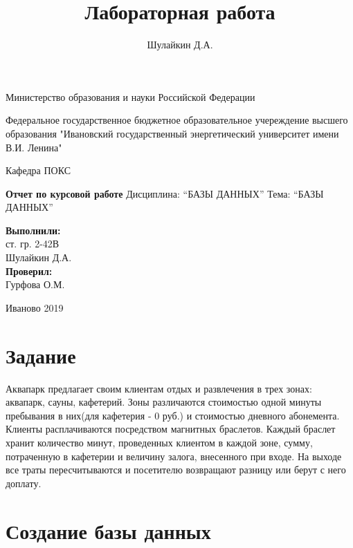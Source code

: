 \documentclass[a4paper]{article}
\title{Лабораторная работа}
\author{Шулайкин Д.А.}
\begin{document}
\onehalfspacing
\thispagestyle{empty}

\begin{center}
Министерство образования и науки Российской Федерации
\vspace{10pt}

Федеральное государственное бюджетное образовательное учереждение высшего образования "Ивановский государственный энергетический университет имени В.И. Ленина"
\vspace{40pt}

Кафедра ПОКС
\vspace{40pt}

\textbf{Отчет по курсовой работе}
Дисциплина: ``БАЗЫ ДАННЫХ''
Тема: ``БАЗЫ ДАННЫХ''
\end{center}

\vspace{330pt}

\begin{flushright}
\textbf{Выполнили:} \\
ст. гр. 2-42В \\
Шулайкин Д.А. \\

\textbf{Проверил:} \\
Гурфова О.М.
\end{flushright}

\vspace{40pt}

\begin{center}
	Иваново 2019
\end{center}

\pagebreak

\section{Задание}
Аквапарк предлагает своим клиентам отдых и развлечения в трех зонах: аквапарк, сауны, кафетерий.
Зоны различаются стоимостью одной минуты пребывания в них(для кафетерия - 0 руб.) и стоимостью дневного абонемента.
Клиенты расплачиваются посредством магнитных браслетов. 
Каждый браслет хранит количество минут, проведенных клиентом в каждой зоне, сумму, 
потраченную в кафетерии и величину залога, внесенного при входе.
На выходе все траты пересчитываются и посетителю возвращают разницу или берут с него доплату.

\section{Создание базы данных}
\end{document}

